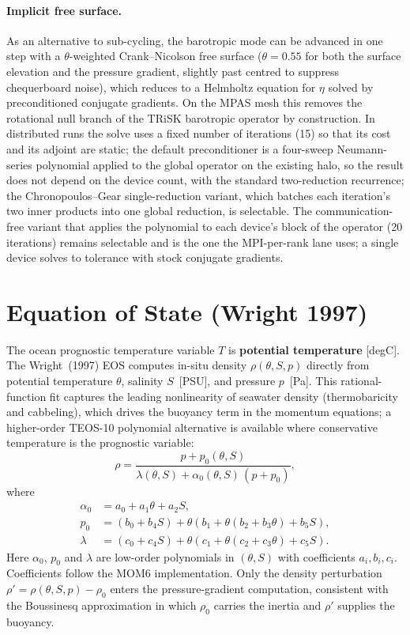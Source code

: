\documentclass[11pt,twoside]{report}
\begin{document}
\paragraph{Implicit free surface.}
As an alternative to sub-cycling, the barotropic mode can be advanced in one
step with a $\theta$-weighted Crank--Nicolson free surface
($\theta=0.55$ for both the surface elevation and the pressure gradient,
slightly past centred to suppress chequerboard noise), which reduces to a
Helmholtz equation for $\eta$ solved by preconditioned conjugate gradients.
On the MPAS mesh this removes the rotational null branch of the TRiSK
barotropic operator by construction.  In distributed runs the solve uses a
fixed number of iterations (15) so that its cost and its adjoint are
static; the default preconditioner is a four-sweep Neumann-series
polynomial applied to the global operator on the existing halo, so the
result does not depend on the device count, with the standard
two-reduction recurrence; the Chronopoulos--Gear single-reduction variant,
which batches each iteration's two inner products into one global
reduction, is selectable.  The communication-free variant that applies the
polynomial to each device's block of the operator (20 iterations) remains
selectable and is the one the MPI-per-rank lane uses; a single device
solves to tolerance with stock conjugate gradients.


\section{Equation of State (Wright 1997)}
\label{sec:eos}

The ocean prognostic temperature variable $T$ is \textbf{potential
temperature} [degC].  The Wright~(1997) EOS \citep{Wright1997} computes
in-situ density $\rho(\theta,S,p)$ directly from potential temperature
$\theta$, salinity $S$~[PSU], and pressure $p$~[Pa].  This rational-function
fit captures the leading nonlinearity of seawater density (thermobaricity
and cabbeling), which drives the buoyancy term in the momentum equations;
a higher-order TEOS-10 polynomial alternative \citep{Roquet2015,
McDougallBarker2011} is available where conservative temperature is the
prognostic variable:
\begin{equation}
  \rho = \frac{p+p_0(\theta,S)}{\lambda(\theta,S)+\alpha_0(\theta,S)\,(p+p_0)},
\end{equation}
where
\begin{align}
  \alpha_0 &= a_0+a_1 \theta+a_2 S, \\
  p_0 &= (b_0+b_4 S)+\theta(b_1+\theta(b_2+b_3 \theta)+b_5 S), \\
  \lambda &= (c_0+c_4 S)+\theta(c_1+\theta(c_2+c_3 \theta)+c_5 S).
\end{align}
Here $\alpha_0$, $p_0$ and $\lambda$ are low-order polynomials in
$(\theta,S)$ with coefficients $a_i,b_i,c_i$.  Coefficients follow the
MOM6 implementation.  Only the density perturbation
$\rho'=\rho(\theta,S,p)-\rho_0$ enters the pressure-gradient computation,
consistent with the Boussinesq approximation in which $\rho_0$ carries the
inertia and $\rho'$ supplies the buoyancy.
\end{document}
